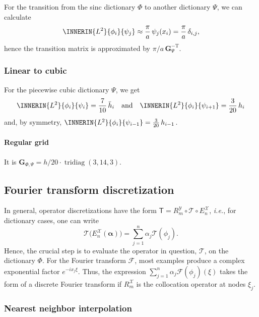 \documentclass[a4paper]{paper}
\newcommand*{\SPC}[1]{{\ensuremath{\mathscr{#1}}}}
\newcommand*{\OP}[1]{{\ensuremath{\mathcal{#1}}}}
\newcommand*{\OPT}{\OP{T}}
\newcommand{\DISCOP}[1]{{\ensuremath{\mathsf{#1}}}}
\newcommand*{\EXT}[2]{\ensuremath{E_{#1}^{#2}}}
\newcommand*{\REST}[2]{\ensuremath{R_{#1}^{#2}}}
\newcommand*{\RmX}{{\ensuremath{\REST{m}{\SPC{X}}}}}
\newcommand*{\RmY}{{\ensuremath{\REST{m}{\SPC{Y}}}}}
\newcommand*{\EnX}{{\ensuremath{\EXT{n}{\SPC{X}}}}}
\newcommand*{\FT}{\OP{F}}
\DeclareMathOperator{\TRIDIAG}{{tridiag}}
\newcommand*{\I}{\ensuremath{\mathit{i}}}
\newcommand*{\ie}{\textsl{i.e.}\xspace}
\newcommand*{\BDalpha}{\boldsymbol{\alpha}}
\newcommand*{\BDG}{\boldsymbol{G}}
\begin{document}
For the transition from the sinc dictionary $\Phi$ to another dictionary $\Psi$, we can calculate
%
\begin{equation*}
 \INNERIN{L^2}{\phi_i}{\psi_j} \approx \frac{\pi}{a}\, \psi_j(x_i) = \frac{\pi}{a}\, \delta_{i,j},
\end{equation*}
%
hence the transition matrix is approximated by ${\pi}/{a}\, \BDG_\Psi^{-\mathrm{T}}$.



\subsubsection{Linear to cubic}
\label{subsubsec:specif:rediscr:lin2cub}

For the piecewise cubic dictionary $\Psi$, we get
%
\begin{equation*}
 \INNERIN{L^2}{\phi_i}{\psi_i} = \frac{7}{10}\, \bar h_i
 \quad \text{and} \quad
 \INNERIN{L^2}{\phi_i}{\psi_{i+1}} = \frac{3}{20}\, h_i
\end{equation*}
%
and, by symmetry, $\INNERIN{L^2}{\phi_i}{\psi_{i-1}} = \frac{3}{20}\, h_{i-1}$.

\paragraph{Regular grid}

It is $\BDG_{\Phi, \Psi} = h/20\cdot\TRIDIAG(3, 14, 3)$.


\subsection{Fourier transform discretization}
\label{subsec:specif:fourier}

In general, operator discretizations have the form $\DISCOP{T} = \RmY \circ \OPT \circ \EnX$, \ie, for dictionary 
cases, one can write
%
\begin{equation*}
 \OPT\big( \EnX(\BDalpha) \big) = \sum_{j=1}^n \alpha_j \OPT(\phi_j).
\end{equation*}
%
Hence, the crucial step is to evaluate the operator in question, $\OPT$, on the dictionary $\Phi$. For the Fourier 
transform $\FT$, most examples produce a complex exponential factor $e^{-\I x_j \xi}$. Thus, the expression 
$\sum_{j=1}^n \alpha_j \FT(\phi_j)(\xi)$ takes the form of a discrete Fourier transform if $\RmX$ is the collocation 
operator at nodes $\xi_j$. 



\subsubsection{Nearest neighbor interpolation}
\label{subsubsec:specif:fourier:nn}
\end{document}
